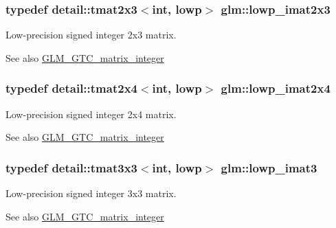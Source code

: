 \subsubsection[{\texorpdfstring{lowp\+\_\+imat2x3}{lowp_imat2x3}}]{\setlength{\rightskip}{0pt plus 5cm}typedef detail\+::tmat2x3$<$int, lowp$>$ {\bf glm\+::lowp\+\_\+imat2x3}}\hypertarget{group__gtc__matrix__integer_ga5757953c508a6e05bf3573d6c099cf88}{}\label{group__gtc__matrix__integer_ga5757953c508a6e05bf3573d6c099cf88}
Low-\/precision signed integer 2x3 matrix. \begin{DoxySeeAlso}{See also}
\hyperlink{group__gtc__matrix__integer}{G\+L\+M\+\_\+\+G\+T\+C\+\_\+matrix\+\_\+integer} 
\end{DoxySeeAlso}
\subsubsection[{\texorpdfstring{lowp\+\_\+imat2x4}{lowp_imat2x4}}]{\setlength{\rightskip}{0pt plus 5cm}typedef detail\+::tmat2x4$<$int, lowp$>$ {\bf glm\+::lowp\+\_\+imat2x4}}\hypertarget{group__gtc__matrix__integer_ga4d859ef48cdfb15b2c9acc98064dd272}{}\label{group__gtc__matrix__integer_ga4d859ef48cdfb15b2c9acc98064dd272}
Low-\/precision signed integer 2x4 matrix. \begin{DoxySeeAlso}{See also}
\hyperlink{group__gtc__matrix__integer}{G\+L\+M\+\_\+\+G\+T\+C\+\_\+matrix\+\_\+integer} 
\end{DoxySeeAlso}
\subsubsection[{\texorpdfstring{lowp\+\_\+imat3}{lowp_imat3}}]{\setlength{\rightskip}{0pt plus 5cm}typedef detail\+::tmat3x3$<$int, lowp$>$ {\bf glm\+::lowp\+\_\+imat3}}\hypertarget{group__gtc__matrix__integer_ga149b90591e7275193c85cc08acbf0024}{}\label{group__gtc__matrix__integer_ga149b90591e7275193c85cc08acbf0024}
Low-\/precision signed integer 3x3 matrix. \begin{DoxySeeAlso}{See also}
\hyperlink{group__gtc__matrix__integer}{G\+L\+M\+\_\+\+G\+T\+C\+\_\+matrix\+\_\+integer} 
\end{DoxySeeAlso}
